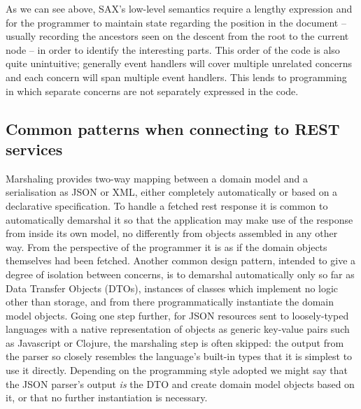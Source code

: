 \documentclass[]{article}
\begin{document}
As we can see above, SAX's low-level semantics require a lengthy
expression and for the programmer to maintain state regarding the
position in the document -- usually recording the ancestors seen on the
descent from the root to the current node -- in order to identify the
interesting parts. This order of the code is also quite unintuitive;
generally event handlers will cover multiple unrelated concerns and each
concern will span multiple event handlers. This lends to programming in
which separate concerns are not separately expressed in the code.

\subsection{Common patterns when connecting to REST services}

Marshaling provides two-way mapping between a domain model and a
serialisation as JSON or XML, either completely automatically or based
on a declarative specification. To handle a fetched rest response it is
common to automatically demarshal it so that the application may make
use of the response from inside its own model, no differently from
objects assembled in any other way. From the perspective of the
programmer it is as if the domain objects themselves had been fetched.
Another common design pattern, intended to give a degree of isolation
between concerns, is to demarshal automatically only so far as Data
Transfer Objects (DTOs), instances of classes which implement no logic
other than storage, and from there programmatically instantiate the
domain model objects. Going one step further, for JSON resources sent to
loosely-typed languages with a native representation of objects as
generic key-value pairs such as Javascript or Clojure, the marshaling
step is often skipped: the output from the parser so closely resembles
the language's built-in types that it is simplest to use it directly.
Depending on the programming style adopted we might say that the JSON
parser's output \emph{is} the DTO and create domain model objects based
on it, or that no further instantiation is necessary.
\end{document}
